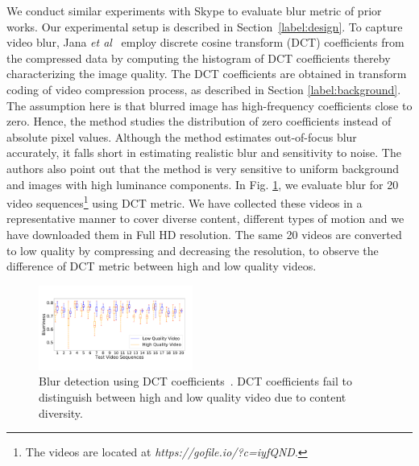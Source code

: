 We conduct similar experiments with Skype to evaluate blur metric of prior works. 
Our experimental setup is described in Section~\ref{label:design}. 
To capture video blur, Jana {\em et al}~\cite{jana2016qoe}  employ discrete cosine transform (DCT) coefficients \cite{marichal1999blur} from the compressed data by computing the histogram of DCT coefficients thereby characterizing the image quality. 
The DCT coefficients are obtained in transform coding of video compression process, as described in Section \ref{label:background}. 
The assumption here is that blurred image has high-frequency coefficients close to zero. 
Hence, the method studies the distribution of zero coefficients instead of absolute pixel values. 
Although the method estimates out-of-focus blur accurately, it falls short in estimating realistic blur and sensitivity to noise. 
The authors also point out that the method is very sensitive to uniform background and images with high luminance components. 
In Fig. \ref{fig:ucdavis}, we evaluate blur for 20 video sequences\footnote{\scriptsize{The videos are located at \textit{https://gofile.io/?c=iyfQND}.}} using DCT metric. 
We have collected these videos in a representative manner to cover diverse content, different types of motion and we have downloaded them in Full HD resolution. 
The same 20 videos are converted to low quality by compressing and decreasing the resolution, to observe the difference of DCT metric between high and low quality videos.

\begin{figure}[t]
	\centering
	\vspace*{-2em}
	\includegraphics[width=0.45\textwidth]{sections/network-work/dct-blur}
	\vspace*{-2em}
	\caption{Blur detection using DCT coefficients~\cite{jana2016qoe,marichal1999blur}. DCT coefficients fail to distinguish between high and low quality video due to content diversity.}
	\label{fig:ucdavis}
	\vspace*{-0.5cm}
\end{figure}

